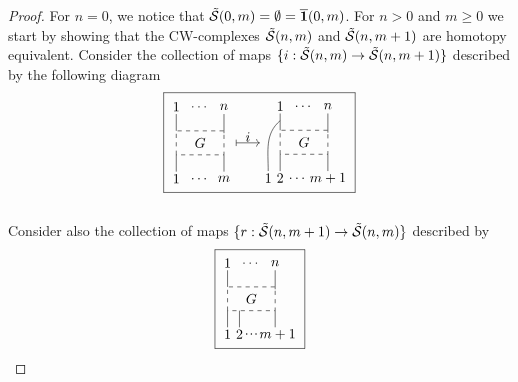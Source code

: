 \begin{proof} 			
	For $n=0$, we notice that $\tilde{\S}(0,m) = \emptyset = \overline{\1}(0,m)$. For $n>0$ and $m\geq0$ we start by showing that the CW-complexes $\tilde{\S}(n,m)$ and $\tilde{\S}(n,m+1)$ are homotopy equivalent. Consider the collection of maps $\{i:\tilde{\S}(n,m)\to\tilde{\S}(n,m+1)\}$ described by the following diagram\\
	\begin{equation*}
	\boxed{\begin{tikzpicture}[scale=.6]
		\node at (0,2) {$1$}; \draw (0,1.7) -- (0,1);
		\node at (1,2) {$\dots$};
		\node at (2,2) {$n$}; \draw (2,1.7) -- (2,.9);
		
		\draw [dashed] (0,0) rectangle (2,1); \node at (1, .5) {$G$};
		
		\node at (0,-1) {$1$}; \draw (0,-.7) -- (0,0);
		\node at (1,-1) {$\dots$};
		\node at (2,-1) {$m$}; \draw (2,-.7) -- (2,0);
		
		\node at (3,.75) {$i$}; \draw [|->] (2.5,.5) -- (3.5,.5);
		\end{tikzpicture}
		\begin{tikzpicture}[scale=.6]
		\node at (0,2) {$1$}; \draw (0,1.7) -- (0,1);
		\node at (1,2) {$\dots$};
		\node at (2,2) {$n$}; \draw (2,1.7) -- (2,.9);
		
		\draw [dashed] (0,0) rectangle (2,1); \node at (1, .5) {$G$};
		
		\node at (-.5,-1) {$1$}; \draw (-.5,-.7)  to[out=90,in=-140]  (0,1.4);
		\node at (0,-1) {$2$}; \draw (0,-.7) -- (0,0);
		\node at (.75,-1) {$\dots$};
		\node at (2,-1) {$m+1$}; \draw (2,-.7) -- (2,0);
		\end{tikzpicture}}
	\end{equation*}\\
	Consider also the collection of maps $\{r:\tilde{\S}(n,m+1)\to\tilde{\S}(n,m)\}$ described by\\
	\begin{equation*}
	\boxed{\begin{tikzpicture}[scale=.6]
		\node at (0,2) {$1$}; \draw (0,1.7) -- (0,1);
		\node at (1,2) {$\dots$};
		\node at (2,2) {$n$}; \draw (2,1.7) -- (2,.9);
		
		\draw [dashed] (0,0) rectangle (2,1); \node at (1, .5) {$G$};
		
		\draw (0,-.7) -- (0,0);
		\node at (0,-1) {$1$};
		\node at (.5,-1) {$2$}; \draw (.5,-.7) -- (.5,0);
		\node at (1,-1) {$\cdot\!\cdot\!\cdot$};
		\node at (2.1,-1) {$m+1$}; \draw (2,-.7) -- (2,0);
		

\end{tikzpicture}}
\end{equation*}
\end{proof}
